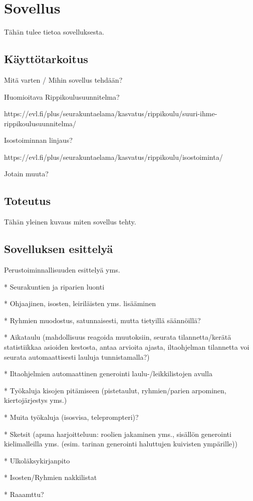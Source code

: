 \chapter{Sovellus}%
\label{ch:sovellus}

Tähän tulee tietoa sovelluksesta.

\section{Käyttötarkoitus}

Mitä varten / Mihin sovellus tehdään?

Huomioitava Rippikoulusuunnitelma?

https://evl.fi/plus/seurakuntaelama/kasvatus/rippikoulu/suuri-ihme-rippikoulusuunnitelma/

Isostoiminnan linjaus?

https://evl.fi/plus/seurakuntaelama/kasvatus/rippikoulu/isostoiminta/

Jotain muuta?

\section{Toteutus}

Tähän yleinen kuvaus miten sovellus tehty.

\section{Sovelluksen esittelyä}

Perustoiminnallisuuden esittelyä yms.

* Seurakuntien ja riparien luonti

* Ohjaajinen, isosten, leiriläisten yms. lisääminen

* Ryhmien muodostus, satunnaisesti, mutta tietyillä säännöillä?

* Aikataulu (mahdollisuus reagoida muutoksiin, seurata tilannetta/kerätä statistiikkaa asioiden kestosta, antaa arvioita ajasta, iltaohjelman tilannetta voi seurata automaattisesti lauluja tunnistamalla?)

* Iltaohjelmien automaattinen generointi laulu-/leikkilistojen avulla

* Työkaluja kisojen pitämiseen (pistetaulut, ryhmien/parien arpominen, kiertojärjestys yms.)

* Muita työkaluja (isosvisa, teleprompteri)?

* Sketsit (apuna harjoitteluun: roolien jakaminen yms., sisällön generointi kielimalleilla yms. (esim. tarinan generointi haluttujen kuivisten ympärille))

* Ulkoläksykirjanpito

* Isosten/Ryhmien nakkilistat

* Raaamttu?
